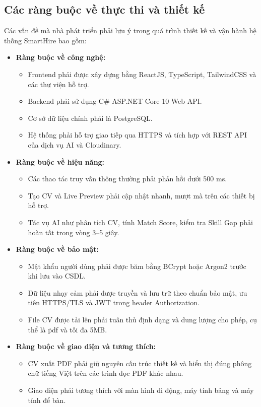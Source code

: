\subsection{Các ràng buộc về thực thi và thiết kế}

Các vấn đề mà nhà phát triển phải lưu ý trong quá trình thiết kế và vận hành hệ thống SmartHire bao gồm:

\begin{itemize}
    \item \textbf{Ràng buộc về công nghệ:}
    \begin{itemize}
        \item Frontend phải được xây dựng bằng ReactJS, TypeScript, TailwindCSS và các thư viện hỗ trợ.
        \item Backend phải sử dụng C\# ASP.NET Core 10 Web API.
        \item Cơ sở dữ liệu chính phải là PostgreSQL.
        \item Hệ thống phải hỗ trợ giao tiếp qua HTTPS và tích hợp với REST API của dịch vụ AI và Cloudinary.
    \end{itemize}

    \item \textbf{Ràng buộc về hiệu năng:}
    \begin{itemize}
        \item Các thao tác truy vấn thông thường phải phản hồi dưới 500 ms.
        \item Tạo CV và Live Preview phải cập nhật nhanh, mượt mà trên các thiết bị hỗ trợ.
        \item Tác vụ AI như phân tích CV, tính Match Score, kiểm tra Skill Gap phải hoàn tất trong vòng 3--5 giây.
    \end{itemize}

    \item \textbf{Ràng buộc về bảo mật:}
    \begin{itemize}
        \item Mật khẩu người dùng phải được băm bằng BCrypt hoặc Argon2 trước khi lưu vào CSDL.
        \item Dữ liệu nhạy cảm phải được truyền và lưu trữ theo chuẩn bảo mật, ưu tiên HTTPS/TLS và JWT trong header Authorization.
        \item File CV được tải lên phải tuân thủ định dạng và dung lượng cho phép, cụ thể là \.pdf và tối đa 5MB.
    \end{itemize}

    \item \textbf{Ràng buộc về giao diện và tương thích:}
    \begin{itemize}
        \item CV xuất PDF phải giữ nguyên cấu trúc thiết kế và hiển thị đúng phông chữ tiếng Việt trên các trình đọc PDF khác nhau.
        \item Giao diện phải tương thích với màn hình di động, máy tính bảng và máy tính để bàn.
    \end{itemize}
\end{itemize}

